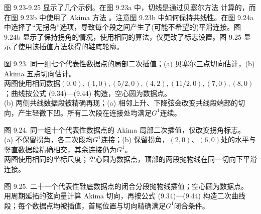 \documentclass[../main.tex]{subfiles}
\begin{document}
图 9.23-9.25 显示了几个示例。在图 9.23a 中，切线是通过贝塞尔方法 \cite{DeBo78} 计算的，而在图 9.23b 中使用了 Akima 方法 \cite{Akim70}。注意图 9.23b 中如何保持共线性。在图 9.24a 中选择了“无拐角”选项，导致每个段之间产生了(可能不希望的)平滑连接。图 9.24b 显示了保持拐角的情况，使用相同的算法，仅更改了标志设置。图 9.25 显示了使用该插值方法获得的鞋底轮廓。


\begin{center}
\begin{minipage}{27cm}
\vspace*{.6\baselineskip}
\centering
{}
\par\smallskip
图 9.23. 同一组七个代表性数据点的局部二次插值；(a) 贝塞尔三点切向估计，(b) Akima 五点切向估计。\\
两图使用相同数据$(0,0),(1,0),(5/2,0),(4,2),(11/2,0),(7,0),(8,0)$；曲线按公式 (9.34)—(9.44) 构造，空心圆为数据点。\\
(b) 两侧共线数据段被精确再现；(a) 相邻上升、下降弦会改变共线段端部的切向，产生轻微下凹。所有二次段在连接处均满足$G^1$连续。
\end{minipage}
\end{center}

\begin{center}
\begin{minipage}{23cm}
\vspace*{.6\baselineskip}
\centering
{}
\par\smallskip
图 9.24. 同一组十个代表性数据点的 Akima 局部二次插值，仅改变拐角标志。\\
(a) 不保留拐角，各二次段均$G^1$连接；(b) 保留拐角，$(2,0)$、$(6,0)$处的水平与竖直数据段精确相交，其余连接仍为$G^1$。\\
两图使用相同的坐标尺度；空心圆为数据点，顶部的两段抛物线在同一切向下平滑连接。
\end{minipage}
\end{center}

\begin{center}
\begin{minipage}{30cm}
\vspace*{.6\baselineskip}
\centering
{}
\par\smallskip
图 9.25. 二十一个代表性鞋底数据点的闭合分段抛物线插值；空心圆为数据点。\\
用周期延拓的弦向量计算 Akima 切向，再按公式 (9.34)—(9.44) 构造二次曲线段；每个数据点均被插值，首尾位置与切向精确满足$G^1$闭合条件。
\end{minipage}
\end{center}
\end{document}
